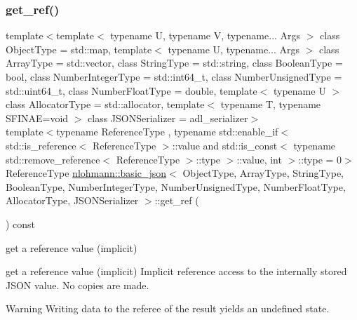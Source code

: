\subsubsection{\texorpdfstring{get\_ref()}{get\_ref()}\hspace{0.1cm}{\footnotesize\ttfamily [2/2]}}
{\footnotesize\ttfamily template$<$template$<$ typename U, typename V, typename... Args $>$ class Object\+Type = std\+::map, template$<$ typename U, typename... Args $>$ class Array\+Type = std\+::vector, class String\+Type  = std\+::string, class Boolean\+Type  = bool, class Number\+Integer\+Type  = std\+::int64\+\_\+t, class Number\+Unsigned\+Type  = std\+::uint64\+\_\+t, class Number\+Float\+Type  = double, template$<$ typename U $>$ class Allocator\+Type = std\+::allocator, template$<$ typename T, typename S\+F\+I\+N\+A\+E=void $>$ class J\+S\+O\+N\+Serializer = adl\+\_\+serializer$>$ \\
template$<$typename Reference\+Type , typename std\+::enable\+\_\+if$<$ std\+::is\+\_\+reference$<$ Reference\+Type $>$\+::value and std\+::is\+\_\+const$<$ typename std\+::remove\+\_\+reference$<$ Reference\+Type $>$\+::type $>$\+::value, int $>$\+::type  = 0$>$ \\
Reference\+Type \mbox{\hyperlink{classnlohmann_1_1basic__json}{nlohmann\+::basic\+\_\+json}}$<$ Object\+Type, Array\+Type, String\+Type, Boolean\+Type, Number\+Integer\+Type, Number\+Unsigned\+Type, Number\+Float\+Type, Allocator\+Type, J\+S\+O\+N\+Serializer $>$\+::get\+\_\+ref (\begin{DoxyParamCaption}{ }\end{DoxyParamCaption}) const\hspace{0.3cm}{\ttfamily [inline]}}



get a reference value (implicit) 

get a reference value (implicit) Implicit reference access to the internally stored J\+S\+ON value. No copies are made.

\begin{DoxyWarning}{Warning}
Writing data to the referee of the result yields an undefined state.
\end{DoxyWarning}

